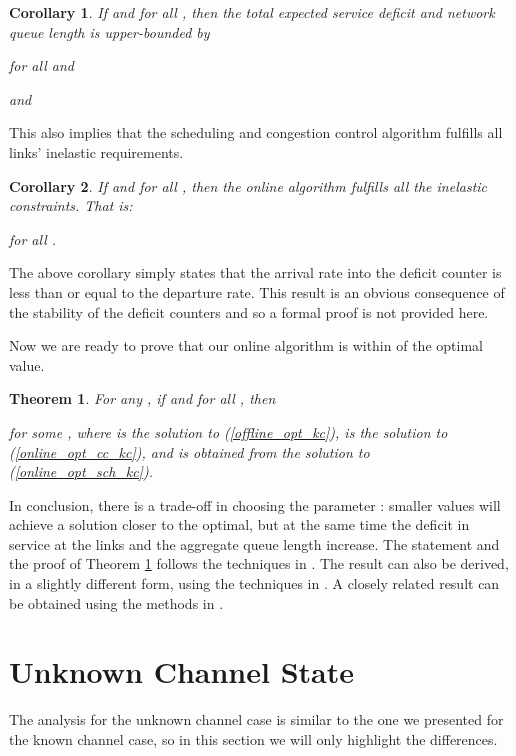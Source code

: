 \documentclass[conference]{IEEEtran}
\newtheorem{theorem}{Theorem}
\newtheorem{corollary}{Corollary}
\begin{document}
\begin{corollary}
\label{def_queue_bound_kc}
If  and  for all , then the total expected service deficit and network queue length is upper-bounded by

for all  and

and


\end{corollary}

This also implies that the scheduling and congestion control algorithm fulfills all links' inelastic requirements.
\begin{corollary}
If  and  for all , then the online algorithm fulfills all the inelastic constraints. That is:

for all .

\end{corollary}

The above corollary simply states that the arrival rate into the deficit counter is less than or equal to the departure rate. This result is an obvious consequence of the stability of the deficit counters and so a formal proof is not provided here.

Now we are ready to prove that our online algorithm is within  of the optimal value.
\begin{theorem}
\label{optimality_online_kc}
For any , if  and  for all , then

for some , where  is the solution to (\ref{offline_opt_kc}),  is the solution to (\ref{online_opt_cc_kc}), and  is obtained from the solution to (\ref{online_opt_sch_kc}).

\end{theorem}

In conclusion, there is a trade-off in choosing the parameter : smaller values will achieve a solution closer to the optimal, but at the same time the deficit in service at the links and the aggregate queue length increase. The statement and the proof of Theorem \ref{optimality_online_kc} follows the techniques in \cite{Neely05}. The result can also be derived, in a slightly different form, using the techniques in \cite{Stolyar05}. A closely related result can be obtained using the methods in \cite{Eryilmaz05}.

\section{Unknown Channel State}
\label{unknown_channel_case}

The analysis for the unknown channel case is similar to the one we presented for the known channel case, so in this section we will only highlight the differences.
\end{document}
